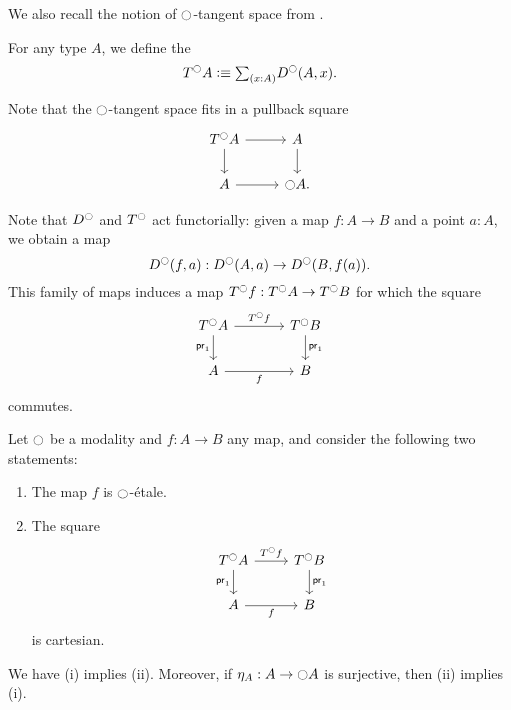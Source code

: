 \documentclass[9pt,twosided]{amsart}
\begin{document}
We also recall the notion of ${\ocircle}$-tangent space from \cite{wellen-thesis}.

\begin{defn}
  For any type $A$, we define the 
  \begin{equation*}
    T^\modal A \defeq \sm{x:A}D^\modal(A,x).
  \end{equation*}
\end{defn}

Note that the ${\ocircle}$-tangent space fits in a pullback square
\begin{equation*}
  \begin{tikzcd}
    T^\modal A \arrow[r] \arrow[d] & A \arrow[d] \\
    A \arrow[r] & \modal A.
  \end{tikzcd}
\end{equation*}

Note that $D^{\ocircle}$ and $T^{\ocircle}$ act functorially: given a map $f:A\to B$ and a point $a:A$, we obtain a map
\begin{equation*}
  D^{\ocircle}(f,a) : D^{\ocircle}(A,a)\to D^{\ocircle}(B,f(a)).
\end{equation*}
This family of maps induces a map $T^{\ocircle} f:T^{\ocircle} A \to T^{\ocircle} B$ for which the square
\begin{equation*}
  \begin{tikzcd}[column sep=large]
    T^\modal A \arrow[r,"T^\modal f"] \arrow[d,swap,"\proj 1"] & T^\modal B \arrow[d,"\proj 1"] \\
    A \arrow[r,swap,"f"] & B
  \end{tikzcd}
\end{equation*}
commutes.

\begin{prp}\label{lem:etale_char}
  Let ${\ocircle}$ be a modality and $f:A\to B$ any map, and consider the following two statements:
  \begin{enumerate}
  \item The map $f$ is ${\ocircle}$-\'etale.
  \item The square
    \begin{equation*}
      \begin{tikzcd}
        T^\modal A \arrow[r,"T^\modal f"] \arrow[d,swap,"\proj 1"] & T^\modal B \arrow[d,"\proj 1"] \\
        A \arrow[r,swap,"f"] & B
      \end{tikzcd}
    \end{equation*}
    is cartesian.
  \end{enumerate}
  We have (i) implies (ii). Moreover, if $\eta_A:A\to{\ensuremath{\ocircle}} A$ is surjective, then (ii) implies (i).
\end{prp}
\end{document}
